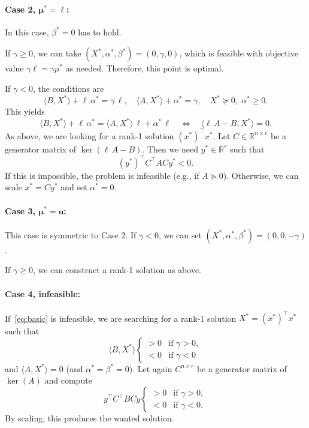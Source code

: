 \documentclass[10pt, a4paper]{article}
\newcommand{\skal}[2]{\langle{#1},{#2}\rangle}
\newcommand{\T}{^{\top}}
\newcommand{\R}{\mathds{R}}
\begin{document}
\paragraph{Case 2, $\boldsymbol{\mu^* = \ell}$:}

In this case, $\beta^* = 0$ has to hold.

If $\gamma \geq 0$, we can take
$(X^*, \alpha^*, \beta^*) = (0, \gamma, 0)$, which is feasible with
objective value $\gamma \ell = \gamma \mu^*$ as needed. Therefore, this
point is optimal.

If $\gamma < 0$, the conditions are
\[
\skal{B}{X^*} + \ell\, \alpha^* = \gamma\, \ell,\quad
\skal{A}{X^*} + \alpha^* = \gamma,\quad X^* \succeq 0,\; \alpha^* \geq 0.
\]
This yields
\[
\skal{B}{X^*} + \ell\, \alpha^* = \skal{A}{X^*}\, \ell + \alpha^*\, \ell
\quad\Leftrightarrow\quad
\skal{\ell\, A - B}{X^*} = 0.
\]
As above, we are looking for a rank-1 solution $(x^*)\T x^*$. Let
$C \in \R^{n \times r}$ be a generator matrix of $\ker(\ell\, A - B)$. Then
we need $y^* \in \R^r$ such that
\[
(y^*)\T C\T A C y^* < 0.
\]
If this is impossible, the problem is infeasible (e.g., if $A \succeq
0$). Otherwise, we can scale $x^* = C y^*$ and set $\alpha^* = 0$.

\paragraph{Case 3, $\boldsymbol{\mu^* = u}$:}

This case is symmetric to Case 2. If $\gamma < 0$, we can set
$(X^*, \alpha^*, \beta^*) = (0, 0, -\gamma)$.

If $\gamma \geq 0$, we can construct a rank-1 solution as above.

\paragraph{Case 4, infeasible:}

If~\eqref{eq:basic} is infeasible, we are searching for a rank-1 solution
$X^* = (x^*)\T x^*$ such that
\[
\skal{B}{X^*}
\begin{cases}
 > 0 & \text{if } \gamma > 0,\\
 < 0 & \text{if } \gamma < 0
\end{cases}
\]
and $\skal{A}{X^*} = 0$ (and $\alpha^* = \beta^* = 0$). Let again $C^{n
  \times r}$ be a generator matrix of $\ker(A)$ and compute
\[
y\T C\T B C y
\begin{cases}
  > 0 & \text{if } \gamma > 0,\\
  < 0 & \text{if } \gamma < 0.
\end{cases}
\]
By scaling, this produces the wanted solution.
\end{document}
